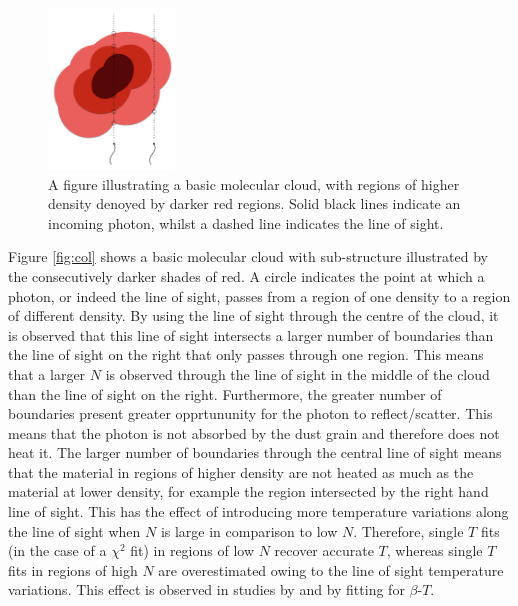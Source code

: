 \documentclass{report}
\begin{document}
\begin{figure}[h]
  \begin{center}
    \includegraphics[width=0.3\textwidth]{../img/column.png}
    \caption[A figure illustrating a basic molecular cloud, with regions of higher density denoyed by darker red regions. Solid black lines indicate an incoming photon, whilst a dashed line indicates the line of sight.]{A figure illustrating a basic molecular cloud, with regions of higher density denoyed by darker red regions. Solid black lines indicate an incoming photon, whilst a dashed line indicates the line of sight.}
  \end{center}
\end{figure} \label{fig:col}

Figure \ref{fig:col} shows a basic molecular cloud with sub-structure illustrated by the consecutively darker shades of red. A circle indicates the point at which a photon, or indeed the line of sight, passes from a region of one density to a region of different density. By using the line of sight through the centre of the cloud, it is observed that this line of sight intersects a larger number of boundaries than the line of sight on the right that only passes through one region. This means that a larger $N$ is observed through the line of sight in the middle of the cloud than the line of sight on the right. Furthermore, the greater number of boundaries present greater opprtununity for the photon to reflect/scatter. This means that the photon is not absorbed by the dust grain and therefore does not heat it. The larger number of boundaries through the central line of sight means that the material in regions of higher density are not heated as much as the material at lower density, for example the region intersected by the right hand line of sight. This has the effect of introducing more temperature variations along the line of sight when $N$ is large in comparison to low $N$. Therefore, single $T$ fits (in the case of a $\chi^{2}$ fit) in regions of low $N$ recover accurate $T$, whereas single $T$ fits in regions of high $N$ are overestimated owing to the line of sight temperature variations. This effect is observed in studies by \textcite{noise,noiseb} and \textcite{kelly} by fitting for $\beta$-$T$.
\end{document}
